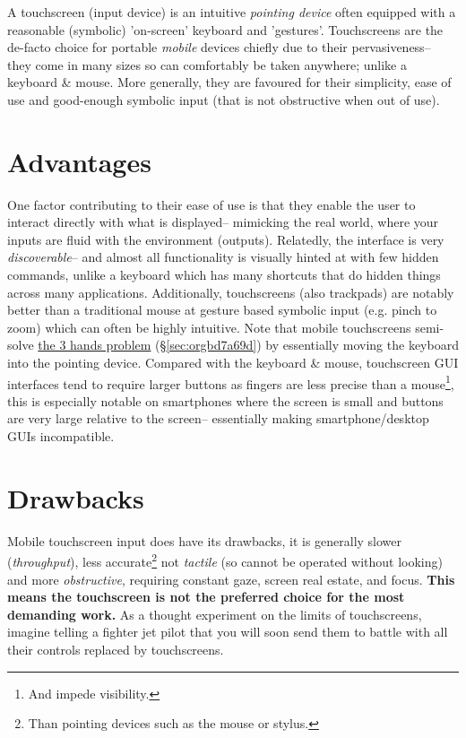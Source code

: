 \documentclass[logo,bsc,singlespacing,parskip]{infthesis}
\begin{document}
A touchscreen (input device) is an intuitive  \emph{pointing device} often equipped with a reasonable (symbolic) 'on-screen' keyboard and 'gestures'.
Touchscreens are the de-facto choice for portable \emph{mobile} devices chiefly due to their pervasiveness-- they come in many sizes so can comfortably be taken anywhere; unlike a keyboard \& mouse.
More generally, they are favoured for their simplicity, ease of use and good-enough symbolic input (that is not obstructive when out of use).
\section{Advantages}
\label{sec:orgd6b9e70}
One factor contributing to their ease of use is that they enable the user to interact directly with what is displayed-- mimicking the real world, where your inputs are fluid with the environment (outputs).
Relatedly, the interface is very \emph{discoverable}-- and almost all functionality is visually hinted at with few hidden commands, unlike a keyboard which has many shortcuts that do hidden things across many applications.
Additionally, touchscreens (also trackpads) are notably better than a traditional mouse at gesture based symbolic input (e.g. pinch to zoom) which can often be highly intuitive.
Note that mobile touchscreens semi-solve \hyperref[sec:orgbd7a69d]{the 3 hands problem} (\S \ref{sec:orgbd7a69d}) by essentially moving the keyboard into the pointing device.
Compared with the keyboard \& mouse, touchscreen GUI interfaces tend to require larger buttons as fingers are less precise than a mouse\footnote{And impede visibility.}, this is especially notable on smartphones where the screen is small and buttons are very large relative to the screen-- essentially making smartphone/desktop GUIs incompatible.

\section{Drawbacks}
\label{sec:orge6700d5}
Mobile touchscreen input does have its drawbacks, it is generally slower (\emph{throughput}), less accurate\footnote{Than pointing devices such as the mouse or stylus.}   not \emph{tactile} (so cannot be operated without looking) and more \emph{obstructive}, requiring constant gaze, screen real estate, and focus.
\textbf{This means the touchscreen is not the preferred choice for the most demanding work.}
As a thought experiment on the limits of  touchscreens, imagine telling a fighter jet pilot that you will soon send them to battle with all their controls replaced by touchscreens.
\end{document}
